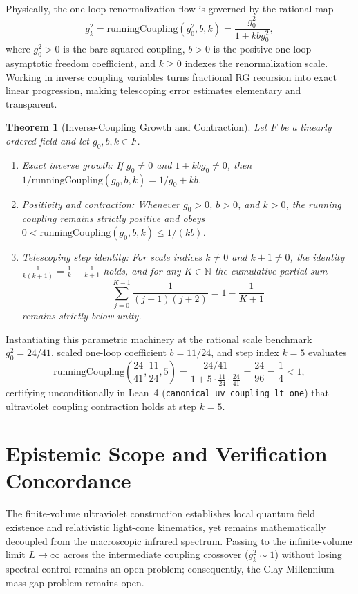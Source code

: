 \documentclass[11pt,a4paper]{article}
\newtheorem{theorem}{Theorem}[section]
\begin{document}
Physically, the one-loop renormalization flow is governed by the rational map
\begin{equation}
g_k^2 = \mathrm{runningCoupling}(g_0^2, b, k) = \frac{g_0^2}{1 + k b g_0^2},
\end{equation}
where $g_0^2 > 0$ is the bare squared coupling, $b > 0$ is the positive one-loop asymptotic freedom coefficient, and $k \ge 0$ indexes the renormalization scale. Working in inverse coupling variables turns fractional RG recursion into exact linear progression, making telescoping error estimates elementary and transparent.

\begin{theorem}[Inverse-Coupling Growth and Contraction]
Let $F$ be a linearly ordered field and let $g_0, b, k \in F$.
\begin{enumerate}
\item \emph{Exact inverse growth:} If $g_0 \neq 0$ and $1 + k b g_0 \neq 0$, then $1 / \mathrm{runningCoupling}(g_0, b, k) = 1 / g_0 + k b$.
\item \emph{Positivity and contraction:} Whenever $g_0 > 0$, $b > 0$, and $k > 0$, the running coupling remains strictly positive and obeys $0 < \mathrm{runningCoupling}(g_0, b, k) \le 1 / (k b)$.
\item \emph{Telescoping step identity:} For scale indices $k \neq 0$ and $k + 1 \neq 0$, the identity $\frac{1}{k(k+1)} = \frac{1}{k} - \frac{1}{k+1}$ holds, and for any $K \in \mathbb{N}$ the cumulative partial sum
\[
\sum_{j=0}^{K-1} \frac{1}{(j+1)(j+2)} = 1 - \frac{1}{K+1}
\]
remains strictly below unity.
\end{enumerate}
\end{theorem}

Instantiating this parametric machinery at the rational scale benchmark $g_0^2 = 24/41$, scaled one-loop coefficient $b = 11/24$, and step index $k = 5$ evaluates
\begin{equation}
\mathrm{runningCoupling}\left(\frac{24}{41}, \frac{11}{24}, 5\right) = \frac{24/41}{1 + 5 \cdot \frac{11}{24} \cdot \frac{24}{41}} = \frac{24}{96} = \frac{1}{4} < 1,
\end{equation}
certifying unconditionally in Lean~4 (\texttt{canonical\_\-uv\_\-coupling\_\-lt\_\-one}) that ultraviolet coupling contraction holds at step $k = 5$.

\section{Epistemic Scope and Verification Concordance}
The finite-volume ultraviolet construction establishes local quantum field existence and relativistic light-cone kinematics, yet remains mathematically decoupled from the macroscopic infrared spectrum. Passing to the infinite-volume limit $L \to \infty$ across the intermediate coupling crossover ($g_k^2 \sim 1$) without losing spectral control remains an open problem; consequently, the Clay Millennium mass gap problem remains open.
\end{document}
